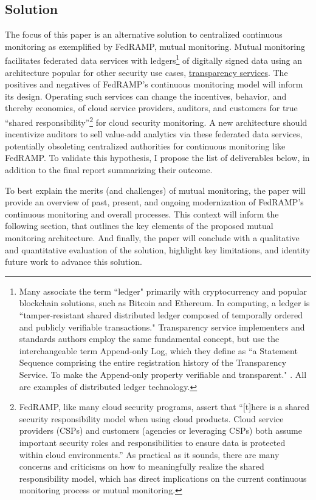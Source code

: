 \documentclass{jdf}
\begin{document}
\subsection{Solution}

The focus of this paper is an alternative solution to centralized continuous monitoring as exemplified by FedRAMP, mutual monitoring. Mutual monitoring facilitates federated data services with ledgers\footnote{Many associate the term ``ledger" primarily with cryptocurrency and popular blockchain solutions, such as Bitcoin and Ethereum. In computing, a ledger is ``tamper-resistant shared distributed ledger composed of temporally ordered and publicly verifiable transactions." \cite{bashir22} Transparency service implementers and standards authors employ the same fundamental concept, but use the interchangeable term Append-only Log, which they define as ``a Statement Sequence comprising the entire registration history of the Transparency Service. To make the Append-only property verifiable and transparent." \cite{scitt25}. All are examples of distributed ledger technology.} of digitally signed data using an architecture popular for other security use cases, \hyperlink{https://transparency.dev}{transparency services}. The positives and negatives of FedRAMP's continuous monitoring model will inform its design. Operating such services can change the incentives, behavior, and thereby economics, of cloud service providers, auditors, and customers for true ``shared responsibility''\footnote{FedRAMP, like many cloud security programs, assert that ``[t]here is a shared security responsibility model when using cloud products. Cloud service providers (CSPs) and customers (agencies or leveraging CSPs) both assume important security roles and responsibilities to ensure data is protected within cloud environments.''\citeyear{fedramp_srm25} As practical as it sounds, there are many concerns and criticisms on how to meaningfully realize the shared responsibility model, which has direct implications on the current continuous monitoring process or mutual monitoring.} for cloud security monitoring. A new architecture should incentivize auditors to sell value-add analytics via these federated data services, potentially obsoleting centralized authorities for continuous monitoring like FedRAMP. To validate this hypothesis, I propose the list of deliverables below, in addition to the final report summarizing their outcome. 

To best explain the merits (and challenges) of mutual monitoring, the paper will provide an overview of past, present, and ongoing modernization of FedRAMP's continuous monitoring and overall processes. This context will inform the following section, that outlines the key elements of the proposed mutual monitoring architecture. And finally, the paper will conclude with a qualitative and quantitative evaluation of the solution, highlight key limitations, and identity future work to advance this solution.
\end{document}
